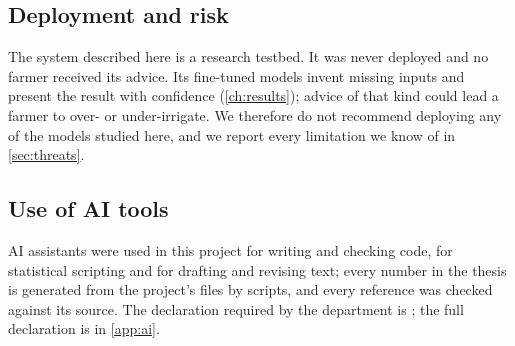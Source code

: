 \subsection*{Deployment and risk}
The system described here is a research testbed. It was never deployed and no farmer received its advice. Its fine-tuned models invent missing inputs and present the result with confidence (\cref{ch:results}); advice of that kind could lead a farmer to over- or under-irrigate. We therefore do not recommend deploying any of the models studied here, and we report every limitation we know of in \cref{sec:threats}.

\subsection*{Use of AI tools}
AI assistants were used in this project for writing and checking code, for statistical scripting and for drafting and revising text; every number in the thesis is generated from the project's files by scripts, and every reference was checked against its source. The declaration required by the department is ; the full declaration is in \cref{app:ai}.

\pagebreak
